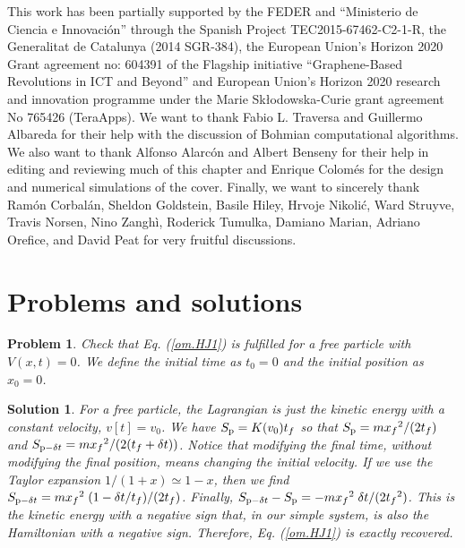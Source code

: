 \documentclass[nofootinbib, secnumarabic, amsmath, nobibnotes,10pt,aps,pra]{revtex4-1}
\newtheorem{problem}{Problem}
\newtheorem{solution}{Solution}
\newcommand{\eref}[1]{Eq. (\ref{#1})}
\begin{document}
This work has been partially supported by the FEDER and  ``Ministerio de Ciencia e Innovaci\'{o}n'' through the Spanish Project TEC2015-67462-C2-1-R,  the Generalitat de Catalunya (2014 SGR-384),  the European Union’s Horizon 2020 Grant agreement no: 604391 of the Flagship initiative  ``Graphene-Based Revolutions in ICT and Beyond'' and European Union’s Horizon 2020 research and innovation programme under the Marie Skłodowska-Curie grant agreement No 765426 (TeraApps).  We want to thank Fabio L. Traversa and Guillermo Albareda for their help with the discussion of Bohmian
computational algorithms. We also want to thank Alfonso Alarc\'{o}n and
Albert Benseny for their help in editing and reviewing much of this
chapter and Enrique Colom\'{e}s for the design and numerical simulations of the cover. Finally, we want to sincerely thank Ram\'on Corbal\'an,
Sheldon Goldstein, Basile Hiley, Hrvoje Nikoli\'c, Ward Struyve, Travis Norsen, Nino Zangh\`i, Roderick Tumulka, Damiano Marian, Adriano Orefice,
and David Peat for very fruitful discussions.\vspace*{-9pt}\\

\section{Problems and solutions}

\begin{problem} \label{om.p1}
Check that \eref{om.HJ1} is fulfilled for a free particle with
$V(x,t) = 0$. We define the initial time as $t_0 = 0$ and the initial
position as $x_0 = 0$.
\end{problem}

\begin{solution}
For a free particle, the Lagrangian is just the kinetic energy with
a constant velocity, $v[t] = v_0$. We have $S_{\rm p} = K(v_0) t_f$
so that $S_{\rm p} = m {x_f}^2/(2 t_f)$ and $S_{{\rm p}-\delta t} =
m {x_f}^2/( 2 (t_f + \delta t))$. Notice that modifying the final
time, without modifying the final position, means changing the
initial velocity. If we use the Taylor expansion  $1/(1 + x)\simeq
1-x$, then we find $S_{{\rm p} - \delta t} = m {x_f}^2 \; (1 -
\delta t/t_f)/(2 t_f)$. Finally, $S_{{\rm p} - \delta t} - S_{\rm p}
= -m {x_f}^2 \; \delta t/(2{t_f}^2)$. This is the kinetic energy
with a negative sign that, in our simple system, is also the
Hamiltonian with a negative sign. Therefore, \eref{om.HJ1} is
exactly recovered.
\end{solution}
\end{document}

